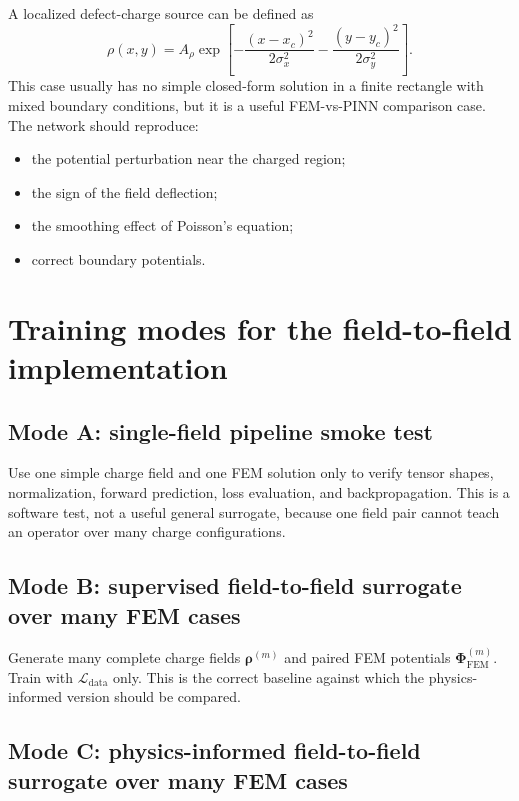 \documentclass[11pt]{article}
\newcommand{\Ldata}{\mathcal{L}_{\mathrm{data}}}
\begin{document}
A localized defect-charge source can be defined as
\begin{equation}
\rho(x,y)=A_{\rho}\exp\left[-\frac{(x-x_c)^2}{2\sigma_x^2}-\frac{(y-y_c)^2}{2\sigma_y^2}\right].
\label{eq:gaussian_charge}
\end{equation}
This case usually has no simple closed-form solution in a finite rectangle with mixed boundary conditions, but it is a useful FEM-vs-PINN comparison case. The network should reproduce:
\begin{itemize}[leftmargin=2em]
    \item the potential perturbation near the charged region;
    \item the sign of the field deflection;
    \item the smoothing effect of Poisson's equation;
    \item correct boundary potentials.
\end{itemize}

\section{Training modes for the field-to-field implementation}

\subsection{Mode A: single-field pipeline smoke test}

Use one simple charge field and one FEM solution only to verify tensor shapes, normalization, forward prediction, loss evaluation, and backpropagation. This is a software test, not a useful general surrogate, because one field pair cannot teach an operator over many charge configurations.

\subsection{Mode B: supervised field-to-field surrogate over many FEM cases}

Generate many complete charge fields $\bm{\rho}^{(m)}$ and paired FEM potentials $\bm{\Phi}_{\mathrm{FEM}}^{(m)}$. Train with $\Ldata$ only. This is the correct baseline against which the physics-informed version should be compared.

\subsection{Mode C: physics-informed field-to-field surrogate over many FEM cases}
\end{document}
